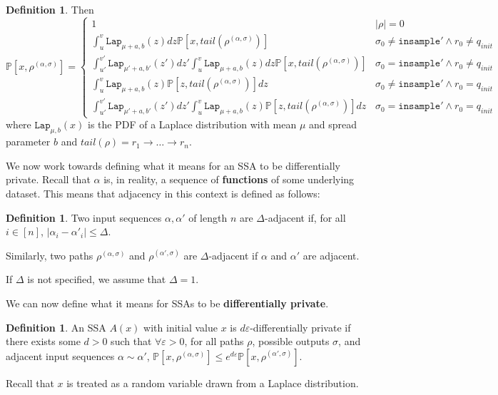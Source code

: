 \documentclass[12pt]{article}
\newcommand{\PP}{\mathbb{P}}
\newcommand{\Lap}{\texttt{Lap}}
\theoremstyle{definition}
\newtheorem{defn}[thm]{Definition}
\begin{document}
\begin{defn}
    Then \[
        \PP[x, \rho^{(\alpha, \sigma)}] = \begin{cases}
            1 & |\rho| = 0\\
            \int_u^v \Lap_{\mu+a, b}(z)dz\PP[x, tail(\rho^{(\alpha, \sigma)})]& \sigma_0 \neq \texttt{insample}' \land r_0 \neq q_{init}\\
            \int_{u'}^{v'}\Lap_{\mu'+a, b'}(z')dz'\int_u^v \Lap_{\mu+a, b}(z)dz\PP[x, tail(\rho^{(\alpha, \sigma)})]& \sigma_0 = \texttt{insample}' \land r_0 \neq q_{init}\\
            \int_u^v \Lap_{\mu+a, b}(z)\PP[z, tail(\rho^{(\alpha, \sigma)})]dz& \sigma_0 \neq \texttt{insample}' \land r_0 = q_{init}\\
            \int_{u'}^{v'}\Lap_{\mu'+a, b'}(z')dz'\int_u^v \Lap_{\mu+a, b}(z)\PP[z, tail(\rho^{(\alpha, \sigma)})]dz& \sigma_0 = \texttt{insample}' \land r_0 = q_{init}
        \end{cases}
    \] 
    where $\Lap_{\mu, b}(x)$ is the PDF of a Laplace distribution with mean $\mu$ and spread parameter $b$ and $tail(\rho) = r_1\to\ldots\to r_n$.
\end{defn}

We now work towards defining what it means for an SSA to be differentially private. Recall that $\alpha$ is, in reality, a sequence of \textbf{functions} of some underlying dataset. This means that adjacency in this context is defined as follows:

\begin{defn}
    Two input sequences $\alpha, \alpha'$ of length $n$ are $\Delta$-adjacent if, for all $i\in [n]$, $|\alpha_i-\alpha'_i|\leq \Delta$. 

    Similarly, two paths $\rho^{(\alpha, \sigma)}$ and $\rho^{(\alpha', \sigma)}$ are $\Delta$-adjacent if $\alpha$ and $\alpha'$ are adjacent. 

    If $\Delta$ is not specified, we assume that $\Delta = 1$. 
\end{defn}

We can now define what it means for SSAs to be \textbf{differentially private}.

\begin{defn}
    An SSA $A(x)$ with initial value $x$ is $d\varepsilon$-differentially private if there exists some $d>0$ such that $\forall \varepsilon> 0$, for all paths $\rho$, possible outputs $\sigma$, and adjacent input sequences $\alpha\sim \alpha'$, $\PP[x, \rho^{(\alpha, \sigma)}]\leq e^{d\varepsilon}\PP[x, \rho^{(\alpha', \sigma)}]$. 

    Recall that $x$ is treated as a random variable drawn from a Laplace distribution. 
\end{defn}
\end{document}
